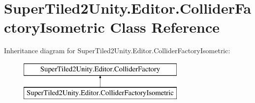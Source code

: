 \hypertarget{class_super_tiled2_unity_1_1_editor_1_1_collider_factory_isometric}{}\section{Super\+Tiled2\+Unity.\+Editor.\+Collider\+Factory\+Isometric Class Reference}
\label{class_super_tiled2_unity_1_1_editor_1_1_collider_factory_isometric}
Inheritance diagram for Super\+Tiled2\+Unity.\+Editor.\+Collider\+Factory\+Isometric\+:\begin{figure}[H]
\begin{center}
\leavevmode
\includegraphics[height=2.000000cm]{class_super_tiled2_unity_1_1_editor_1_1_collider_factory_isometric}
\end{center}
\end{figure}

